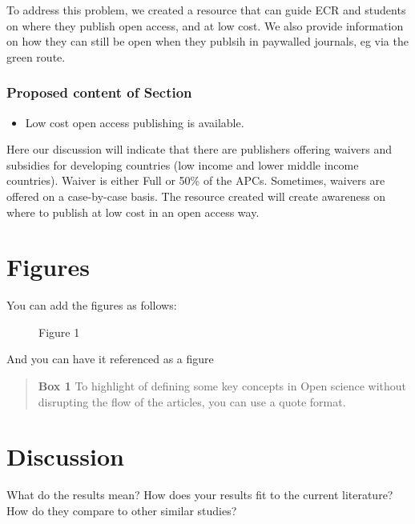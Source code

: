 To address this problem, we created a resource that can guide ECR and
students on where they publish open access, and at low cost. We also
provide information on how they can still be open when they publsih in
paywalled journals, eg via the green route.

\subsubsection{Proposed content of
Section}\label{proposed-content-of-section}

\begin{itemize}
\tightlist
\item
  Low cost open access publishing is available.
\end{itemize}

Here our discussion will indicate that there are publishers offering
waivers and subsidies for developing countries (low income and lower
middle income countries). Waiver is either Full or 50\% of the APCs.
Sometimes, waivers are offered on a case-by-case basis. The resource
created will create awareness on where to publish at low cost in an open
access way.

\section*{Figures}\label{figures}

You can add the figures as follows:

\begin{figure}[htbp]
\centering
\caption{Figure 1}
\end{figure}

And you can have it referenced as a figure

\begin{quote}
\textbf{Box 1} To highlight of defining some key concepts in Open
science without disrupting the flow of the articles, you can use a quote
format.
\end{quote}

\section*{Discussion}\label{discussion}

What do the results mean? How does your results fit to the current
literature? How do they compare to other similar studies?

